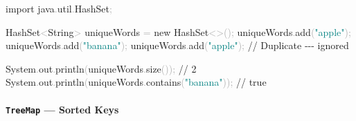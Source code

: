 \documentclass[
  justified,
  openright,
]{tufte-book}
\let\subsubsection\paragraph
\let\paragraph\paragraph
\newcommand{\BuiltInTok}[1]{#1}
\newcommand{\CommentTok}[1]{\textcolor{MidGray}{#1}}
\newcommand{\FunctionTok}[1]{\textcolor{BrandBlue}{#1}}
\newcommand{\ImportTok}[1]{\textcolor{BrandAccent}{#1}}
\newcommand{\KeywordTok}[1]{\textcolor{BrandBlue}{#1}}
\newcommand{\NormalTok}[1]{#1}
\newcommand{\OperatorTok}[1]{\textcolor{DarkGray}{#1}}
\newcommand{\StringTok}[1]{\textcolor{Teal}{#1}}
\newenvironment{Shaded}{%
  \begin{snugshade}
}{%
  \end{snugshade}
}
\let\subsubsection\paragraph
\let\paragraph\paragraph
\begin{document}
\begin{Shaded}
\begin{Highlighting}[]
\KeywordTok{import} \ImportTok{java}\OperatorTok{.}\ImportTok{util}\OperatorTok{.}\ImportTok{HashSet}\OperatorTok{;}

\BuiltInTok{HashSet}\OperatorTok{\textless{}}\BuiltInTok{String}\OperatorTok{\textgreater{}}\NormalTok{ uniqueWords }\OperatorTok{=} \KeywordTok{new} \BuiltInTok{HashSet}\OperatorTok{\textless{}\textgreater{}();}
\NormalTok{uniqueWords}\OperatorTok{.}\FunctionTok{add}\OperatorTok{(}\StringTok{"apple"}\OperatorTok{);}
\NormalTok{uniqueWords}\OperatorTok{.}\FunctionTok{add}\OperatorTok{(}\StringTok{"banana"}\OperatorTok{);}
\NormalTok{uniqueWords}\OperatorTok{.}\FunctionTok{add}\OperatorTok{(}\StringTok{"apple"}\OperatorTok{);}   \CommentTok{// Duplicate {-}{-}{-} ignored}

\BuiltInTok{System}\OperatorTok{.}\FunctionTok{out}\OperatorTok{.}\FunctionTok{println}\OperatorTok{(}\NormalTok{uniqueWords}\OperatorTok{.}\FunctionTok{size}\OperatorTok{());}          \CommentTok{// 2}
\BuiltInTok{System}\OperatorTok{.}\FunctionTok{out}\OperatorTok{.}\FunctionTok{println}\OperatorTok{(}\NormalTok{uniqueWords}\OperatorTok{.}\FunctionTok{contains}\OperatorTok{(}\StringTok{"banana"}\OperatorTok{));} \CommentTok{// true}
\end{Highlighting}
\end{Shaded}

\subsubsection{\texorpdfstring{\texttt{TreeMap} --- Sorted
Keys}{TreeMap --- Sorted Keys}}\label{treemap-sorted-keys}
\end{document}
